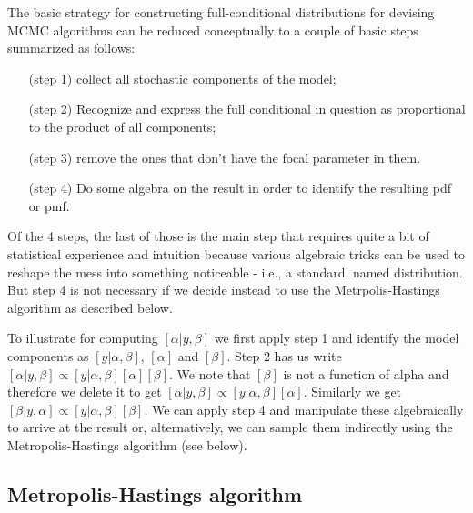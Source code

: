 The basic strategy for constructing full-conditional distributions for devising MCMC algorithms can be reduced conceptually to a couple of basic steps summarized as follows:
\begin{itemize}
\item[(step 1)] collect all stochastic components of the model; 
\item[(step 2)] Recognize and express the full conditional in question as proportional to the product of all  components; 
\item[(step 3)] remove the ones that don't have the focal parameter in them. 
\item[(step 4)] Do some algebra on the result in order to identify the resulting pdf or pmf. 
\end{itemize}
Of the 4 steps, the last of those is the main step that requires quite a bit of statistical experience and intuition because various algebraic tricks can be used to reshape the mess into something noticeable - i.e., a standard, named distribution. But step 4 is not necessary if we decide instead to use the Metrpolis-Hastings algorithm as described below. 


To illustrate for computing $[\alpha|y,\beta]$ we first apply step 1 and identify the model components as $[y|\alpha, \beta]$, $[\alpha]$ and $[\beta]$. Step 2 has us write $[\alpha|y,\beta] \propto [y|\alpha,\beta][\alpha][\beta]$.  We note that $[\beta]$ is not a function of alpha and therefore we delete it to get $[\alpha|y,\beta] \propto [y|\alpha,\beta][\alpha]$. Similarly we get $[\beta|y,\alpha] \propto [y|\alpha,\beta][\beta]$. We can apply step 4 and manipulate these algebraically to arrive at the result or, alternatively, we can sample them indirectly using the Metropolis-Hastings algorithm (see below).   


\subsection{Metropolis-Hastings algorithm}
 
